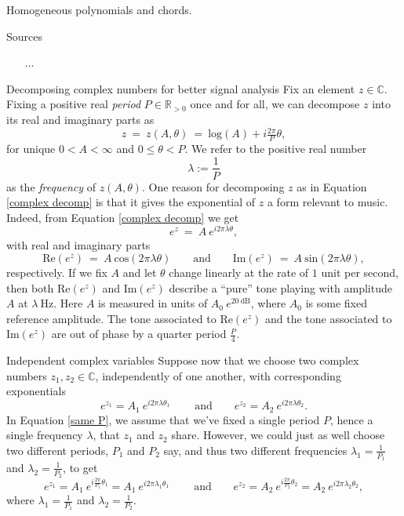 \documentclass[letterpaper,11pt, reqno]{amsart}
\newtheorem{monodromy theorem}{Monodromy Theorem}[subsection]
\newtheorem{wild conjecture}[theorem]{Wild Conjecture}
\newtheorem{research objectives}{Research objectives}[subsection]
\newtheorem{research question}[theorem]{Research questions}
\newtheorem{aside question}[theorem]{Aside question}
\newtheorem{audio example}[theorem]{\loudspeaker[3] Example}
\newtheorem{blank remark}[theorem]{}
\newtheorem{terminology and comment}[theorem]{Terminology and comment}
\newtheorem{purity hypothesis}[theorem]{Purity hypothesis}
\newtheorem{corollary of the purity hypothesis}[theorem]{Corollary of the purity hypothesis}
\newcommand{\CC} {{\mathbb C}}
\newcommand{\RR} {{\mathbb R}}
\numberwithin{equation}{theorem}
\begin{document}
\vskip 1cm

\begin{section}{Homogeneous polynomials and chords.}

\begin{subsection}{Sources}
	\begin{enumerate}[{\bf\ \ \ \ \ \ 1.}]
	\item
	[...]
	\end{enumerate}
\end{subsection}

\begin{subsection}{Decomposing complex numbers for better signal analysis}
Fix an element $z\in\CC$. Fixing a positive real {\em period} $P\in\RR_{>0}$ once and for all, we can decompose $z$ into its real and imaginary parts as
	\begin{equation}\label{complex decomp}
	z
	\ =\ 
	z(A,\theta)
	\ =\ 
	\text{log}(A)+i\tfrac{2\pi}{P}\theta,
	\end{equation}
for unique $0<A<\infty$ and $0\le \theta<P$. We refer to the positive real number $$\lambda:=\frac{1}{P}$$ as the {\em frequency} of $z(A,\theta)$. One reason for decomposing $z$ as in Equation \eqref{complex decomp} is that it gives the exponential of $z$ a form relevant to music. Indeed, from Equation \eqref{complex decomp} we get
	$$
	e^{z}
	\ =\ 
	A\ \!e^{i2\pi\lambda\theta},
	$$
with real and imaginary parts
	$$
	\text{Re}(e^{z})
	\ =\ 
	A\ \text{cos}(2\pi\lambda\theta)
	\ \ \ \ \ \ \ \ \ \text{and}\ \ \ \ \ \ \ \ \ 
	\text{Im}(e^{z})\ =\ A\ \text{sin}(2\pi\lambda\theta),
	$$
respectively. If we fix $A$ and let $\theta$ change linearly at the rate of $1$ unit per second, then both $\text{Re}(e^{z})$ and $\text{Im}(e^{z})$ describe a ``pure'' tone playing with amplitude $A$ at $\lambda\ \text{Hz}$. Here $A$ is measured in units of $A_0 \ e^{20\ \text{dB}}$, where $A_{0}$ is some fixed reference amplitude. The tone associated to $\text{Re}(e^{z})$ and the tone associated to $\text{Im}(e^{z})$ are out of phase by a quarter period $\frac{P}{4}$.

\end{subsection}

\begin{subsection}{Independent complex variables}
Suppose now that we choose two complex numbers $z_1,z_2\in\CC$, independently of one another, with corresponding exponentials
	\begin{equation}\label{same P}
	e^{z_1}
	=
	A_1\ e^{i2\pi\lambda\theta_1}
	\ \ \ \ \ \ \ \ \ \ \text{and}\ \ \ \ \ \ \ \ \ 
	e^{z_2}
	=
	A_2\ e^{i2\pi\lambda\theta_2}.
	\end{equation}
In Equation \eqref{same P}, we assume that we've fixed a single period $P$, hence a single frequency $\lambda$, that $z_1$ and $z_2$ share. However, we could just as well choose two different periods, $P_1$ and $P_2$ say, and thus two different frequencies $\lambda_1=\tfrac{1}{P_1}$ and $\lambda_2=\tfrac{1}{P_2}$, to get
	$$
	e^{z_1}
	=
	A_1\ e^{i\tfrac{2\pi}{P_1}\theta_1}
	=
	A_1\ e^{i2\pi\lambda_1\theta_1}
	\ \ \ \ \ \ \ \ \ \ \text{and}\ \ \ \ \ \ \ \ \ 
	e^{z_2}
	=
	A_2\ e^{i\tfrac{2\pi}{P_2}\theta_2}
	=
	A_2\ e^{i2\pi\lambda_2\theta_2},
	$$
where $\lambda_1=\tfrac{1}{P_1}$ and $\lambda_2=\tfrac{1}{P_2}$. 


\end{subsection}
\end{section}
\end{document}
